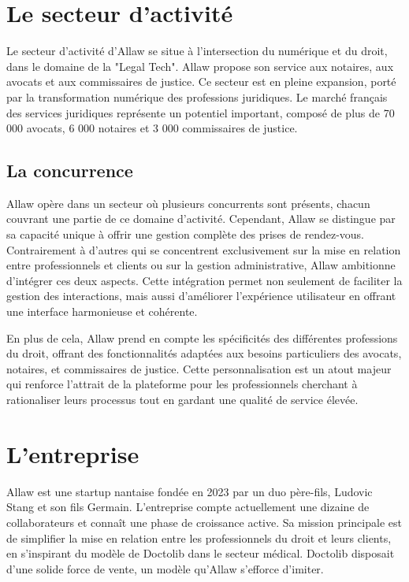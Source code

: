 \section{Le secteur d'activité}
Le secteur d'activité d'Allaw se situe à l'intersection du numérique et du
droit, dans le domaine de la "Legal Tech". Allaw propose son service aux
notaires, aux avocats et aux commissaires de justice. Ce secteur est en pleine
expansion, porté par la transformation numérique des professions juridiques.
Le marché français des services juridiques représente un potentiel important,
composé de plus de 70 000 avocats, 6 000 notaires et 3 000 commissaires de
justice.

\subsection{La concurrence}
Allaw opère dans un secteur où plusieurs concurrents sont présents, chacun
couvrant une partie de ce domaine d'activité. Cependant, Allaw se distingue
par sa capacité unique à offrir une gestion complète des prises de rendez-vous.
Contrairement à d'autres qui se concentrent exclusivement sur la mise en
relation entre professionnels et clients ou sur la gestion administrative, Allaw
ambitionne d'intégrer ces deux aspects. Cette intégration permet non seulement
de faciliter la gestion des interactions, mais aussi d'améliorer l'expérience
utilisateur en offrant une interface harmonieuse et cohérente.

En plus de cela, Allaw prend en compte les spécificités des différentes
professions du droit, offrant des fonctionnalités adaptées aux besoins
particuliers des avocats, notaires, et commissaires de justice. Cette
personnalisation est un atout majeur qui renforce l'attrait de la plateforme
pour les professionnels cherchant à rationaliser leurs processus tout en gardant
une qualité de service élevée.

\section{L'entreprise}
Allaw est une startup nantaise fondée en 2023 par un duo père-fils, Ludovic
Stang et son fils Germain. L'entreprise compte actuellement une dizaine de
collaborateurs et connaît une phase de croissance active. Sa mission principale
est de simplifier la mise en relation entre les professionnels du droit et leurs
clients, en s'inspirant du modèle de Doctolib dans le secteur médical. Doctolib
disposait d'une solide force de vente, un modèle qu'Allaw s'efforce d'imiter.

